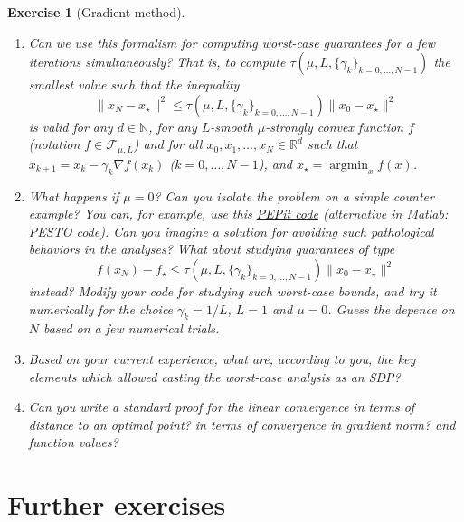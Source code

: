 \documentclass[11pt,a4paper]{article}
\DeclareMathOperator*{\argmin}{argmin}
\newcommand{\pesto}{{PESTO }}
\newcommand{\pepit}{{PEPit }}
\newtheorem{exercise}{Exercise}
\begin{document}
\begin{exercise}[Gradient method]
\begin{enumerate}
For going further: using the following primal-dual pairing
	\begin{equation*}
	...,
	\end{equation*}
a dual problem is given by
	\begin{equation*}
	...,
	\end{equation*}
	 Is there a simple closed-form solution for this problem?
	\item Can we use this formalism for computing worst-case guarantees for a few iterations simultaneously? That is, to compute $\tau(\mu,L,\{\gamma_k\}_{k=0,\hdots,N-1})$ the smallest value such that the inequality
	\[ \|x_{N}-x_\star\|^2 \leqslant \tau(\mu,L,\{\gamma_k\}_{k=0,\ldots,N-1}) \|x_0-x_\star\|^2\]
	is valid for any $d\in\mathbb{N}$, for any $L$-smooth $\mu$-strongly convex function $f$ (notation $f\in\mathcal{F}_{\mu,L}$) and for all $x_0,x_1,\ldots,x_N\in\mathbb{R}^d$ such that $x_{k+1}=x_k-\gamma_k \nabla f(x_k)$ ($k=0,\ldots,N-1$), and $x_\star=\argmin_x f(x)$.
	\item What happens if $\mu=0$? Can you isolate the problem on a simple counter example? You can, for example, use this \href{https://github.com/PerformanceEstimation/Learning-Performance-Estimation/tree/main/Exercises - codes/Jupyter/Exercise1.ipynb}{\pepit code} (alternative in Matlab: \href{https://github.com/PerformanceEstimation/Learning-Performance-Estimation/blob/main/Exercises - codes/Matlab/Exercise1bis_dimreduction.m}{\pesto code}). Can you imagine a solution for avoiding such pathological behaviors in the analyses? What about studying guarantees of type\[ f(x_N)-f_\star \leqslant \tau(\mu,L,\{\gamma_k\}_{k=0,\ldots,N-1}) \|x_0-x_\star\|^2\]
	instead? Modify your code for studying such worst-case bounds, and try it numerically for the choice $\gamma_k=1/L$, $L=1$ and $\mu=0$. Guess the depence on $N$ based on a few numerical trials.
	\item Based on your current experience, what are, according to you, the key elements which allowed casting the worst-case analysis as an SDP?
	\item Can you write a standard proof for the linear convergence in terms of distance to an optimal point? in terms of convergence in gradient norm? and function values?
	\end{enumerate}
	\end{exercise}

	\section{Further exercises}\label{s:furtherex}		%
	
\end{document}
